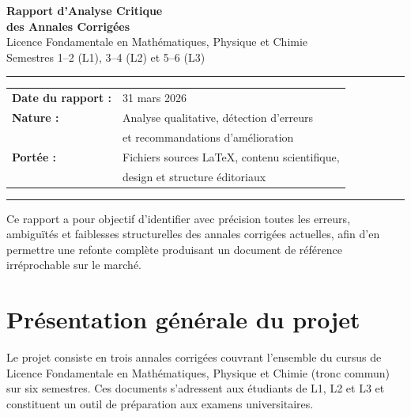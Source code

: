 \documentclass[12pt,a4paper]{article}
\begin{document}
\begin{titlepage}
\begin{center}
\vspace*{2cm}
{\Huge\bfseries\color{RoyalBlue} Rapport d'Analyse Critique}\\[0.5cm]
{\Large\bfseries\color{MidnightBlue} des Annales Corrigées}\\[0.3cm]
{\large Licence Fondamentale en Mathématiques, Physique et Chimie}\\[0.2cm]
{\large Semestres 1--2 (L1), 3--4 (L2) et 5--6 (L3)}

\vspace{1.5cm}
\rule{0.8\linewidth}{1pt}
\vspace{0.5cm}

\begin{tabular}{ll}
\textbf{Date du rapport :} & 31 mars 2026 \\
\textbf{Nature :} & Analyse qualitative, détection d'erreurs \\
& et recommandations d'amélioration \\
\textbf{Portée :} & Fichiers sources \LaTeX, contenu scientifique, \\
& design et structure éditoriaux \\
\end{tabular}

\vspace{1.5cm}
\rule{0.8\linewidth}{1pt}
\vspace{1cm}

\begin{tcolorbox}[colback=RoyalBlue!8!white, colframe=RoyalBlue, width=0.85\linewidth]
\centering\small
Ce rapport a pour objectif d'identifier avec précision toutes les erreurs, ambiguïtés et faiblesses structurelles des annales corrigées actuelles, afin d'en permettre une refonte complète produisant un document de référence irréprochable sur le marché.
\end{tcolorbox}
\end{center}
\end{titlepage}

\tableofcontents
\newpage

\section{Présentation générale du projet}

Le projet consiste en trois annales corrigées couvrant l'ensemble du cursus de Licence Fondamentale en Mathématiques, Physique et Chimie (tronc commun) sur six semestres. Ces documents s'adressent aux étudiants de L1, L2 et L3 et constituent un outil de préparation aux examens universitaires.
\end{document}
